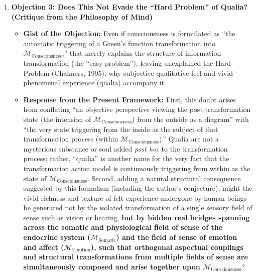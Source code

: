 \documentclass[11pt,a4paper]{article}
\theoremstyle{definition}
\theoremstyle{plain}
\begin{document}
\begin{enumerate}
    \item \textbf{Objection 3: Does This Not Evade the ``Hard Problem'' of Qualia? (Critique from the Philosophy of Mind)}
    \begin{itemize}
        \item \textbf{Gist of the Objection:} Even if consciousness is formulated as ``the automatic triggering of a Green's function transformation into $\mathcal{M}_{\mathrm{Consciousness}}$,'' that merely explains the structure of information transformation (the ``easy problem''), leaving unexplained the Hard Problem (Chalmers, 1995): why subjective qualitative feel and vivid phenomenal experience (qualia) accompany it.
        \item \textbf{Response from the Present Framework:} First, this doubt arises from conflating ``an objective perspective viewing the post-transformation state (the intension of $\mathcal{M}_{\mathrm{Consciousness}}$) from the outside as a diagram'' with ``the very state triggering from the inside as the subject of that transformation process (within $\mathcal{M}_{\mathrm{Consciousness}}$).'' Qualia are not a mysterious substance or soul added \textit{post hoc} to the transformation process; rather, ``qualia'' is another name for the very fact that the transformation action model is continuously triggering from within as the state of $\mathcal{M}_{\mathrm{Consciousness}}$. Second, adding a natural structural consequence suggested by this formalism (including the author's conjecture), might the vivid richness and texture of felt experience undergone by human beings be generated not by the isolated transformation of a single sensory field of sense such as vision or hearing, \textbf{but by hidden real bridges spanning across the somatic and physiological field of sense of the endocrine system ($\mathcal{M}_{\mathrm{Somatic}}$) and the field of sense of emotion and affect ($\mathcal{M}_{\mathrm{Emotion}}$), such that orthogonal aspectual couplings and structural transformations from multiple fields of sense are simultaneously composed and arise together upon $\mathcal{M}_{\mathrm{Consciousness}}$}?
    \end{itemize}


\end{enumerate}
\end{document}
